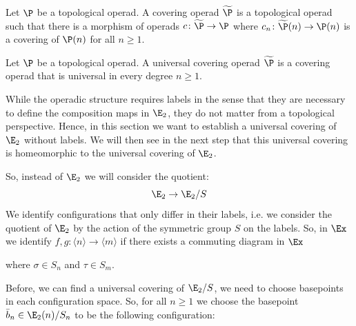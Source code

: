 \begin{defin}
    Let $\P$  be a topological operad. 
    A covering operad $\widetilde{\P}$ is a topological operad 
    such that there is a morphism of operads $c \colon \widetilde{\P} \to \P$ 
    where $c_n \colon \widetilde{\P}(n) \to \P(n)$ is a covering of $\P(n)$ for all $n \geq 1$.
\end{defin}

\begin{defin}
    Let $\P$ be a topological operad. A universal covering operad $\widetilde{\P}$ is a covering 
    operad that is universal in every degree $n \geq 1$.
\end{defin}

While the operadic structure requires labels in the sense that they are necessary to define the 
composition maps in $\E_2$, they do not matter from a topological perspective. Hence, in this 
section we want to establish a universal covering of $\E_2$ without labels. We will then see in
the next step that this universal covering is homeomorphic to the universal covering of $\E_2$.

So, instead of $\E_2$ we will consider the quotient:
\[
    \E_2 \to \E_2 \slash S
\]
We identify configurations that only differ in their labels, i.e. we consider the quotient of 
$\E_2$ by the action of the symmetric group $S$ on the labels.
So, in $\Ex$ we identify $f, g \colon \langle n \rangle \to \langle m \rangle$ 
if there exists a commuting diagram in $\Ex$
\begin{center}
\end{center}
where $\sigma \in S_n$ and $\tau \in S_m$.

Before, we can find a universal covering of $\E_2 \slash S$, we need to choose basepoints in each configuration space.
So, for all $n \geq 1$ we choose the basepoint $\bar{b}_n \in \E_2(n) \slash S_n$ to be the following configuration:
\begin{center}
\end{center}

